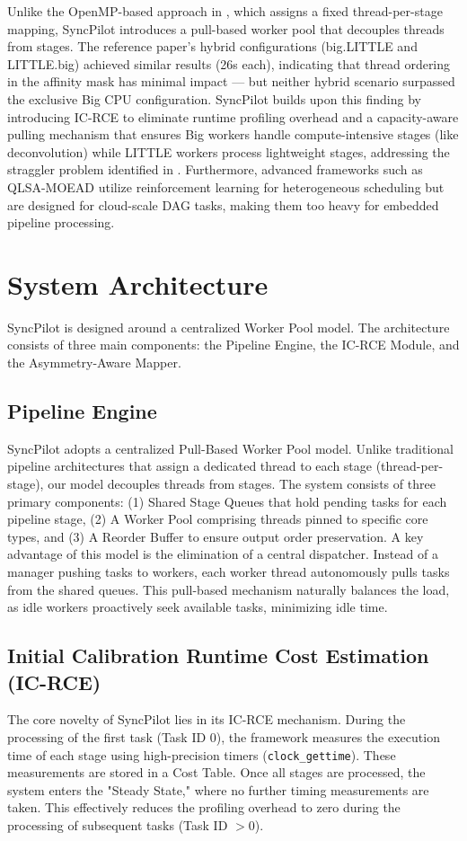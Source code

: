 \documentclass[conference]{IEEEtran}
\begin{document}
Unlike the OpenMP-based approach in \cite{annisa2025fsrcnn}, which assigns a fixed thread-per-stage mapping, SyncPilot introduces a pull-based worker pool that decouples threads from stages. The reference paper's hybrid configurations (big.LITTLE and LITTLE.big) achieved similar results (26s each), indicating that thread ordering in the affinity mask has minimal impact — but neither hybrid scenario surpassed the exclusive Big CPU configuration. SyncPilot builds upon this finding by introducing IC-RCE to eliminate runtime profiling overhead and a capacity-aware pulling mechanism that ensures Big workers handle compute-intensive stages (like deconvolution) while LITTLE workers process lightweight stages, addressing the straggler problem identified in \cite{annisa2025fsrcnn}. Furthermore, advanced frameworks such as QLSA-MOEAD \cite{saad2026qlsa} utilize reinforcement learning for heterogeneous scheduling but are designed for cloud-scale DAG tasks, making them too heavy for embedded pipeline processing.

\section{System Architecture}
SyncPilot is designed around a centralized Worker Pool model. The architecture consists of three main components: the Pipeline Engine, the IC-RCE Module, and the Asymmetry-Aware Mapper.

\subsection{Pipeline Engine}
SyncPilot adopts a centralized Pull-Based Worker Pool model. Unlike traditional pipeline architectures that assign a dedicated thread to each stage (thread-per-stage), our model decouples threads from stages. 
The system consists of three primary components: (1) Shared Stage Queues that hold pending tasks for each pipeline stage, (2) A Worker Pool comprising threads pinned to specific core types, and (3) A Reorder Buffer to ensure output order preservation.
A key advantage of this model is the elimination of a central dispatcher. Instead of a manager pushing tasks to workers, each worker thread autonomously pulls tasks from the shared queues. This pull-based mechanism naturally balances the load, as idle workers proactively seek available tasks, minimizing idle time.

\subsection{Initial Calibration Runtime Cost Estimation (IC-RCE)}
The core novelty of SyncPilot lies in its IC-RCE mechanism. During the processing of the first task (Task ID 0), the framework measures the execution time of each stage using high-precision timers (\texttt{clock\_gettime}). These measurements are stored in a Cost Table. Once all stages are processed, the system enters the "Steady State," where no further timing measurements are taken. This effectively reduces the profiling overhead to zero during the processing of subsequent tasks (Task ID $> 0$).
\end{document}
